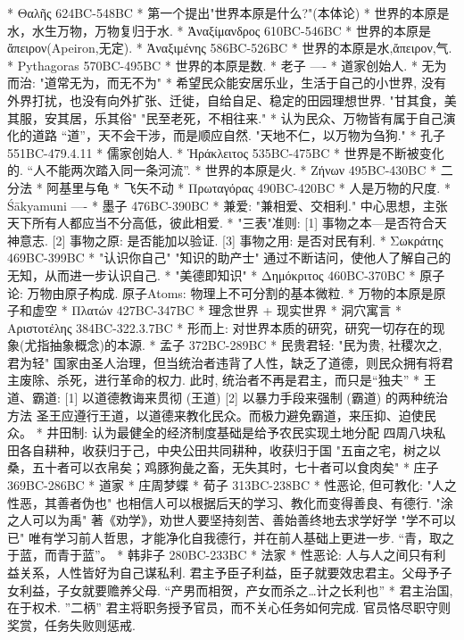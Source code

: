 * Θαλῆς   	624BC-548BC
	* 第一个提出"世界本原是什么?"(本体论)
	* 世界的本原是水，水生万物，万物复归于水.
* Ἀναξίμανδρος	610BC-546BC
	* 世界的本原是ἄπειρον(Apeiron,无定).
* Ἀναξιμένης	586BC-526BC
	* 世界的本原是水,ἄπειρον,气.
* Pythagoras	570BC-495BC
	* 世界的本原是数.
* 老子	----
	* 道家创始人.
	* 无为而治: "道常无为，而无不为"
	* 希望民众能安居乐业，生活于自己的小世界, 没有外界打扰，也没有向外扩张、迁徙，自给自足、稳定的田园理想世界.
	 	"甘其食，美其服，安其居，乐其俗"  "民至老死，不相往来."
	* 认为民众、万物皆有属于自己演化的道路 “道”，天不会干涉，而是顺应自然.  "天地不仁，以万物为刍狗."
* 孔子	551BC-479.4.11
	* 儒家创始人.
* Ἡράκλειτος	535BC-475BC
	* 世界是不断被变化的.  “人不能两次踏入同一条河流”.
	* 世界的本原是火.
* Ζήνων  	495BC-430BC
	* 二分法 * 阿基里与龟 * 飞矢不动
* Πρωταγόρας	490BC-420BC
	* 人是万物的尺度.
* Śākyamuni	----
* 墨子	476BC-390BC
	* 兼爱: "兼相爱、交相利."  中心思想，主张天下所有人都应当不分高低，彼此相爱.
	* "三表"准则: [1] 事物之本—是否符合天神意志. [2] 事物之原: 是否能加以验证. [3] 事物之用: 是否对民有利.
* Σωκράτης	469BC-399BC
	* "认识你自己"  "知识的助产士"  通过不断诘问，使他人了解自己的无知，从而进一步认识自己.
	* "美德即知识"
* Δημόκριτος	460BC-370BC
	* 原子论: 万物由原子构成. 原子Atoms: 物理上不可分割的基本微粒.
	* 万物的本原是原子和虚空
* Πλατών	427BC-347BC
	* 理念世界 + 现实世界
	* 洞穴寓言
* Αριστοτέλης	384BC-322.3.7BC
	* 形而上: 对世界本质的研究，研究一切存在的现象(尤指抽象概念)的本源.
* 孟子	372BC-289BC
	* 民贵君轻: "民为贵, 社稷次之, 君为轻"
		国家由圣人治理，但当统治者违背了人性，缺乏了道德，则民众拥有将君主废除、杀死，进行革命的权力.
		此时, 统治者不再是君主，而只是“独夫”
	* 王道、霸道: [1] 以道德教诲来贯彻 (王道)  [2] 以暴力手段来强制 (霸道)  的两种统治方法
		圣王应遵行王道，以道德来教化民众。而极力避免霸道，来压抑、迫使民众。 
	* 井田制: 认为最健全的经济制度基础是给予农民实现土地分配
		四周八块私田各自耕种，收获归于己，中央公田共同耕种，收获归于国
		"五亩之宅，树之以桑，五十者可以衣帛矣；鸡豚狗彘之畜，无失其时，七十者可以食肉矣"
* 庄子	369BC-286BC
	* 道家
	* 庄周梦蝶
* 荀子	313BC-238BC
	* 性恶论, 但可教化: "人之性恶，其善者伪也"  
		也相信人可以根据后天的学习、教化而变得善良、有德行.  "涂之人可以为禹"
		著《劝学》，劝世人要坚持刻苦、善始善终地去求学好学  "学不可以已"
		唯有学习前人哲思，才能净化自我德行，并在前人基础上更进一步.  “青，取之于蓝，而青于蓝”。
* 韩非子	280BC-233BC
	* 法家
	* 性恶论: 人与人之间只有利益关系，人性皆好为自己谋私利.
		君主予臣子利益，臣子就要效忠君主。父母予子女利益，子女就要赡养父母.
		“产男而相贺，产女而杀之…计之长利也”
	* 君主治国, 在于权术.    ”二柄”
		君主将职务授予官员，而不关心任务如何完成. 官员恪尽职守则奖赏，任务失败则惩戒.

